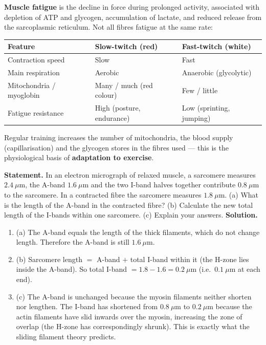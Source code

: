\documentclass[11pt]{article}
\newcounter{popsec}
\newcounter{popsub}
\newcommand{\courssub}[1]{%
  \stepcounter{popsub}%
  \par\vspace{9pt}\noindent{\popxbold\fontsize{11.5}{13}\selectfont\color{popink}{\color{poporange}\thepopsec.\thepopsub}\hspace{6pt}#1}\par\nopagebreak\vspace{4pt}
}
\begin{document}
\courssub{Muscle fatigue and fibre types}

\textbf{Muscle fatigue} is the decline in force during prolonged activity, associated with depletion of ATP and glycogen, accumulation of lactate, and reduced  release from the sarcoplasmic reticulum. Not all fibres fatigue at the same rate:

\begin{center}
\begin{tabularx}{\linewidth}{|l|X|X|}
\hline
\rowcolor{popblueL} \textbf{Feature} & \textbf{Slow-twitch (red)} & \textbf{Fast-twitch (white)} \\
\hline
Contraction speed & Slow & Fast \\
\hline
Main respiration & Aerobic & Anaerobic (glycolytic) \\
\hline
Mitochondria / myoglobin & Many / much (red colour) & Few / little \\
\hline
Fatigue resistance & High (posture, endurance) & Low (sprinting, jumping) \\
\hline
\end{tabularx}
\end{center}

Regular training increases the number of mitochondria, the blood supply (capillarisation) and the glycogen stores in the fibres used — this is the physiological basis of \textbf{adaptation to exercise}.

\begin{exoresolu}
\textbf{Statement.} In an electron micrograph of relaxed muscle, a sarcomere measures $2.4\ \mu\mathrm{m}$, the A-band $1.6\ \mu\mathrm{m}$ and the two I-band halves together contribute $0.8\ \mu\mathrm{m}$ to the sarcomere. In a contracted fibre the sarcomere measures $1.8\ \mu\mathrm{m}$. (a) What is the length of the A-band in the contracted fibre? (b) Calculate the new total length of the I-bands within one sarcomere. (c) Explain your answers.
\tcblower
\textbf{Solution.}
\begin{enumerate}
\item (a) The A-band equals the length of the thick filaments, which do not change length. Therefore the A-band is still $1.6\ \mu\mathrm{m}$.
\item (b) Sarcomere length $=$ A-band $+$ total I-band within it (the H-zone lies inside the A-band). So total I-band $= 1.8 - 1.6 = 0.2\ \mu\mathrm{m}$ (i.e.\ $0.1\ \mu\mathrm{m}$ at each end).
\item (c) The A-band is unchanged because the myosin filaments neither shorten nor lengthen. The I-band has shortened from $0.8\ \mu\mathrm{m}$ to $0.2\ \mu\mathrm{m}$ because the actin filaments have slid inwards over the myosin, increasing the zone of overlap (the H-zone has correspondingly shrunk). This is exactly what the sliding filament theory predicts.
\end{enumerate}
\end{exoresolu}
\end{document}
